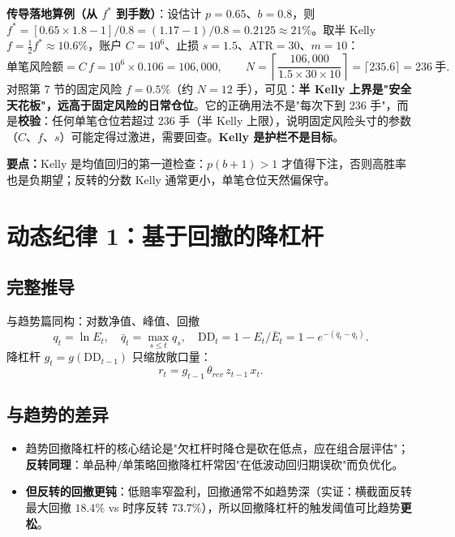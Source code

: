 \documentclass[UTF8,11pt]{ctexart}
\newcommand{\takeaway}[1]{\medskip\par\noindent\textbf{要点：}#1\par\medskip}
\begin{document}
\textbf{传导落地算例（从 $f^{*}$ 到手数）}：设估计 $p=0.65$、$b=0.8$，则 $f^{*}=[0.65\times1.8-1]/0.8=(1.17-1)/0.8=0.2125\approx21\%$。取半 Kelly $f=\tfrac12 f^{*}\approx10.6\%$，账户 $C=10^6$、止损 $s=1.5$、ATR$=30$、$m=10$：
\begin{equation}
\text{单笔风险额}=C\,f=10^6\times0.106=106{,}000,\qquad
N=\left\lceil\frac{106{,}000}{1.5\times30\times10}\right\rceil=\lceil 235.6\rceil=236\ \text{手}.
\end{equation}
对照第 7 节的固定风险 $f=0.5\%$（约 $N=12$ 手），可见：\textbf{半 Kelly 上界是"安全天花板"，远高于固定风险的日常仓位}。它的正确用法不是"每次下到 236 手"，而是\textbf{校验}：任何单笔仓位若超过 $236$ 手（半 Kelly 上限），说明固定风险头寸的参数（$C$、$f$、$s$）可能定得过激进，需要回查。\textbf{Kelly 是护栏不是目标}。

\takeaway{Kelly 是均值回归的第一道检查：$p(b+1)>1$ 才值得下注，否则高胜率也是负期望；反转的分数 Kelly 通常更小，单笔仓位天然偏保守。}

\section{动态纪律 1：基于回撤的降杠杆}
\subsection{完整推导}
与趋势篇同构：对数净值、峰值、回撤
\begin{equation}
q_t=\ln E_t,\quad \bar q_t=\max_{s\le t}q_s,\quad \mathrm{DD}_t=1-E_t/\bar E_t=1-e^{-(\bar q_t-q_t)}.
\end{equation}
降杠杆 $g_t=g(\mathrm{DD}_{t-1})$ 只缩放敞口量：
\begin{equation}
r_t = g_{t-1}\,\theta_{rev}\,z_{t-1}\,x_t.
\end{equation}
\subsection{与趋势的差异}
\begin{itemize}[itemsep=2pt]
\item 趋势回撤降杠杆的核心结论是"欠杠杆时降仓是砍在低点，应在组合层评估"；\textbf{反转同理}：单品种/单策略回撤降杠杆常因"在低波动回归期误砍"而负优化。
\item \textbf{但反转的回撤更钝}：低赔率窄盈利，回撤通常不如趋势深（实证：横截面反转最大回撤 $18.4\%$ vs 时序反转 $73.7\%$），所以回撤降杠杆的触发阈值可比趋势\textbf{更松}。
\end{itemize}
\end{document}
